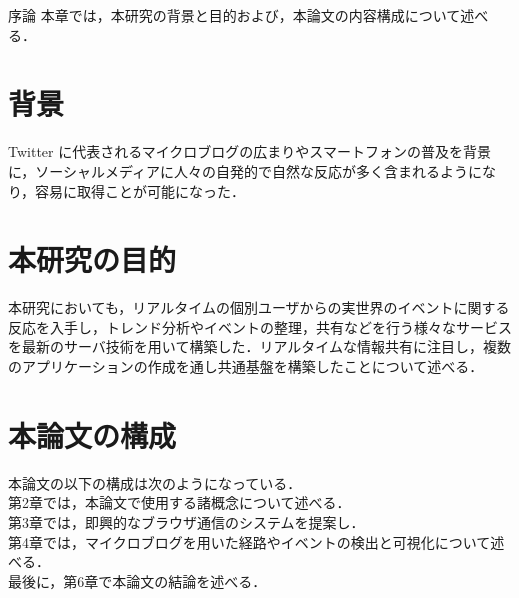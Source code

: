 \chapterhead
{序論}
{本章では，本研究の背景と目的および，本論文の内容構成について述べる．}

\section{背景}
Twitter に代表されるマイクロブログの広まりやスマートフォンの普及を背景に，ソーシャルメディアに人々の自発的で自然な反応が多く含まれるようになり，容易に取得ことが可能になった．


\section{本研究の目的}
本研究においても，リアルタイムの個別ユーザからの実世界のイベントに関する反応を入手し，トレンド分析やイベントの整理，共有などを行う様々なサービスを最新のサーバ技術を用いて構築した．リアルタイムな情報共有に注目し，複数のアプリケーションの作成を通し共通基盤を構築したことについて述べる．


\section{本論文の構成}
本論文の以下の構成は次のようになっている．\\
第2章では，本論文で使用する諸概念について述べる．\\
第3章では，即興的なブラウザ通信のシステムを提案し．\\
第4章では，マイクロブログを用いた経路やイベントの検出と可視化について述べる．\\
最後に，第6章で本論文の結論を述べる．\\

